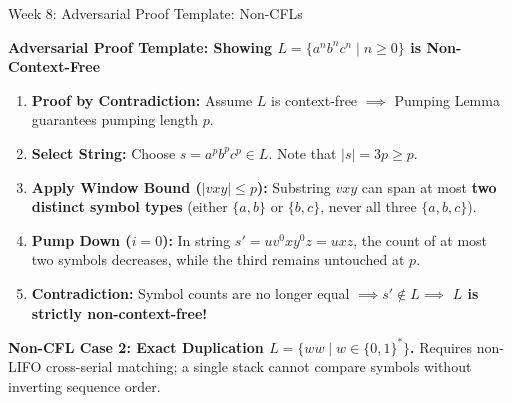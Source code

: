 \documentclass[aspectratio=169, 10pt]{beamer}
\begin{document}
\begin{frame}{Week 8: Adversarial Proof Template: Non-CFLs}
  \begin{tcolorbox}[alertcard]
    {\bfseries\footnotesize\color{accentCrimson} Adversarial Proof Template: Showing $L = \{a^n b^n c^n \mid n \ge 0\}$ is Non-Context-Free}
    \vspace{0.04cm}
    \begin{enumerate}\setlength{\itemsep}{1.5pt}\scriptsize
      \item \textbf{Proof by Contradiction:} Assume $L$ is context-free $\implies$ Pumping Lemma guarantees pumping length $p$.
      \item \textbf{Select String:} Choose $s = a^p b^p c^p \in L$. Note that $|s| = 3p \ge p$.
      \item \textbf{Apply Window Bound ($|vxy| \le p$):} Substring $vxy$ can span at most \textbf{two distinct symbol types} (either $\{a, b\}$ or $\{b, c\}$, never all three $\{a, b, c\}$).
      \item \textbf{Pump Down ($i = 0$):} In string $s' = u v^0 x y^0 z = uxz$, the count of at most two symbols decreases, while the third remains untouched at $p$.
      \item \textbf{Contradiction:} Symbol counts are no longer equal $\implies s' \notin L \implies$ \textbf{$L$ is strictly non-context-free!}
    \end{enumerate}
  \end{tcolorbox}

  \vspace{0.04cm}
  \begin{tcolorbox}[conceptcard, top=2.5pt, bottom=2.5pt]
    \scriptsize
    \textbf{Non-CFL Case 2: Exact Duplication $L = \{ww \mid w \in \{0, 1\}^*\}$.} Requires non-LIFO cross-serial matching; a single stack cannot compare symbols without inverting sequence order.
  \end{tcolorbox}
\end{frame}
\end{document}
